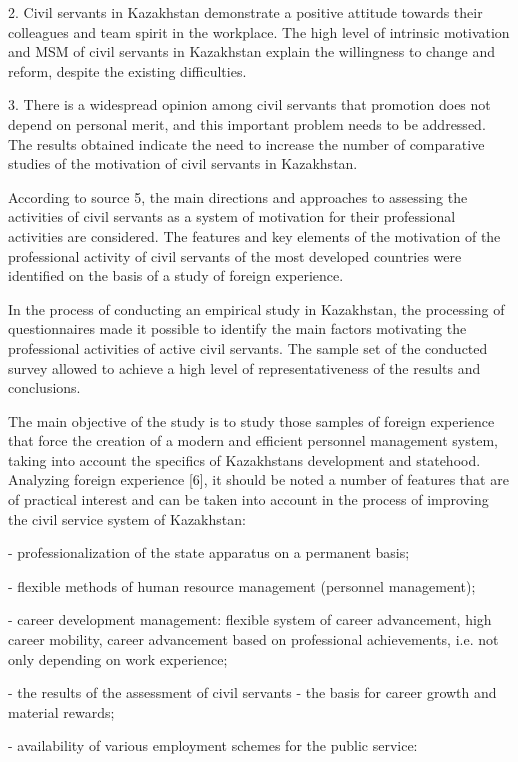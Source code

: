 \begin{multicols}{2}
2. Civil servants in Kazakhstan demonstrate a positive attitude towards
their colleagues and team spirit in the workplace. The high level of
intrinsic motivation and MSM of civil servants in Kazakhstan explain the
willingness to change and reform, despite the existing difficulties.

3. There is a widespread opinion among civil servants that promotion
does not depend on personal merit, and this important problem needs to
be addressed. The results obtained indicate the need to increase the
number of comparative studies of the motivation of civil servants in
Kazakhstan.

According to source 5, the main directions and approaches to assessing
the activities of civil servants as a system of motivation for their
professional activities are considered. The features and key elements of
the motivation of the professional activity of civil servants of the
most developed countries were identified on the basis of a study of
foreign experience.

In the process of conducting an empirical study in Kazakhstan, the
processing of questionnaires made it possible to identify the main
factors motivating the professional activities of active civil servants.
The sample set of the conducted survey allowed to achieve a high level
of representativeness of the results and conclusions.

The main objective of the study is to study those samples of foreign
experience that force the creation of a modern and efficient personnel
management system, taking into account the specifics of
Kazakhstan\textquotesingle s development and statehood. Analyzing
foreign experience {[}6{]}, it should be noted a number of features that
are of practical interest and can be taken into account in the process
of improving the civil service system of Kazakhstan:

- professionalization of the state apparatus on a permanent basis;

- flexible methods of human resource management (personnel management);

- career development management: flexible system of career advancement,
high career mobility, career advancement based on professional
achievements, i.e. not only depending on work experience;

- the results of the assessment of civil servants - the basis for career
growth and material rewards;

- availability of various employment schemes for the public service:


\end{multicols}

